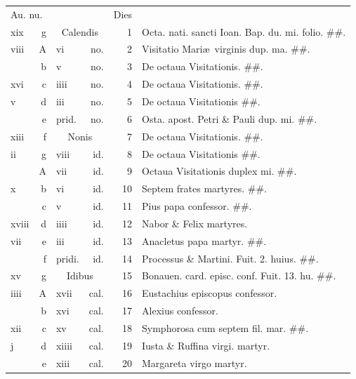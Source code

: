 \documentclass[a5paper,10pt]{book}
\def\ae{æ}
\begin{document}
\begin{center}
\begin{tabular}{l r l r r l}
\multicolumn{2}{l}{\color{red}Au. nu.} & & & \color{red} Dies & \\
xix & g & \multicolumn{2}{c}{\color{red} Calendis} & 1 & Octa. nati. sancti Ioan. Bap. du. mi. \color{black} folio. \#\#.\\
viii & \color{red} A & vi & no. & 2 & \color{red} Visitatio Mari\ae \ virginis dup. ma. \color{black} \#\#.\\
 & b & v & no. & 3 & De octaua Visitationis. \color{black} \#\#.\\
xvi & c & iiii & no. & 4 & De octaua Visitationis. \color{black} \#\#.\\
v & d & iii & no. & 5 & De octaua Visitationis \color{black} \#\#.\\
 & e & \color{red} prid. & no. & 6 & Osta. apost. Petri \& Pauli dup. mi. \color{black} \#\#.\\
xiii & f & \multicolumn{2}{c}{\color{red} Nonis} & 7 & De octaua Visitationis. \#\#.\\
ii & g & viii & id. & 8 & De octaua Visitationis \color{black} \#\#.\\
 & \color{red} A & vii & id. & 9 & Octaua Visitationis duplex mi. \color{black} \#\#.\\
x & b & vi & id. & 10 & Septem frates martyres. \color{black} \#\#.\\
 & c & v & id. & 11 & Pius papa confessor. \#\#.\\
xviii & d & iiii & id. & 12 & Nabor \& Felix martyres. \color{black}\\
vii & e & iii & id. & 13 & Anacletus papa martyr. \#\#.\\
 & f & \color{red} pridi. & id. & 14 & Processus \& Martini. \color{red} Fuit. 2. huius. \color{black} \#\#.\\
xv & g & \multicolumn{2}{c}{\color{red} Idibus} & 15 & Bonauen. card. episc. conf. \color{red} Fuit. 13. hu. \color{black} \#\#.\\
iiii & \color{red} A & xvii & cal. & 16 & Eustachius episcopus confessor. \\
 & b & xvi & cal. & 17 & Alexius confessor. \\
xii & c & xv & cal. & 18 & Symphorosa cum septem fil. mar. \#\#.\\
j & d & xiiii & cal. & 19 & Iusta \& Ruffina virgi. martyr. \\
 & e & xiii & cal. & 20 & Margareta virgo martyr. \\

\end{tabular}
\end{center}
\end{document}
